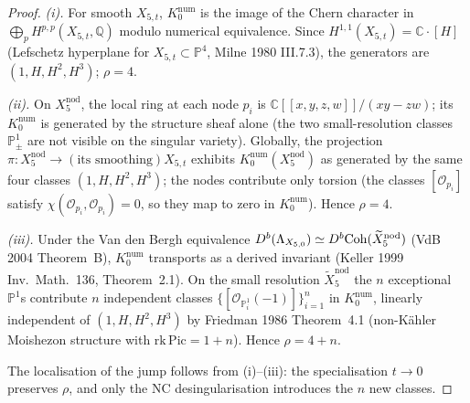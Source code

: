 \begin{proof}
\emph{(i).} For smooth $X_{5,t}$, $K_0^{\mathrm{num}}$ is the image of
the Chern character in $\bigoplus_p H^{p,p}(X_{5,t}, \mathbb Q)$
modulo numerical equivalence. Since
$H^{1,1}(X_{5,t}) = \mathbb C \cdot [H]$ (Lefschetz hyperplane for
$X_{5,t} \subset \mathbb P^4$, Milne 1980 III.7.3), the generators
are $(1, H, H^2, H^3)$; $\rho = 4$.

\emph{(ii).} On $X_5^{\mathrm{nod}}$, the local ring at each node
$p_i$ is $\mathbb C[[x,y,z,w]]/(xy - zw)$; its $K_0^{\mathrm{num}}$ is
generated by the structure sheaf alone (the two small-resolution
classes $\mathbb P^1_\pm$ are not visible on the singular variety).
Globally, the projection $\pi: X_5^{\mathrm{nod}} \to (\text{its
smoothing}) X_{5,t}$ exhibits $K_0^{\mathrm{num}}(X_5^{\mathrm{nod}})$
as generated by the same four classes $(1, H, H^2, H^3)$; the nodes
contribute only torsion (the classes $[\mathcal O_{p_i}]$ satisfy
$\chi(\mathcal O_{p_i}, \mathcal O_{p_i}) = 0$, so they map to zero
in $K_0^{\mathrm{num}}$). Hence $\rho = 4$.

\emph{(iii).} Under the Van den Bergh equivalence
$D^b(\Lambda_{X_{5,0}}) \simeq D^b\mathrm{Coh}(\widetilde X_5^{\mathrm{nod}})$
(VdB 2004 Theorem~B), $K_0^{\mathrm{num}}$ transports as a derived
invariant (Keller 1999 Inv.\ Math.\ 136, Theorem~2.1). On the small
resolution $\widetilde X_5^{\mathrm{nod}}$ the $n$ exceptional
$\mathbb P^1$s contribute $n$ independent classes
$\{[\mathcal O_{\mathbb P^1_i}(-1)]\}_{i=1}^n$ in
$K_0^{\mathrm{num}}$, linearly independent of $(1, H, H^2, H^3)$ by
Friedman 1986 Theorem~4.1 (non-K\"ahler Moishezon structure with
$\mathrm{rk}\, \mathrm{Pic} = 1 + n$). Hence $\rho = 4 + n$.

The localisation of the jump follows from (i)--(iii): the
specialisation $t \to 0$ preserves $\rho$, and only the NC
desingularisation introduces the $n$ new classes.
\end{proof}

